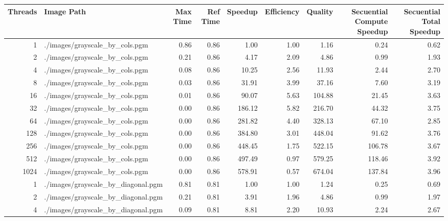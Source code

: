         \begin{table}[H]
            \centering
            \begin{adjustbox}{width=\textwidth, keepaspectratio}
                \begin{tabular}{rlrrrrrrr}
                    \toprule
                    Threads & Image Path & Max Time & Ref Time & Speedup & Efficiency & Quality & Secuential Compute Speedup & Secuential Total Speedup \\
                    \midrule
                    1 & ./images/grayscale\_by\_cols.pgm & 0.86 & 0.86 & 1.00 & 1.00 & 1.16 & 0.24 & 0.62 \\
                    2 & ./images/grayscale\_by\_cols.pgm & 0.21 & 0.86 & 4.17 & 2.09 & 4.86 & 0.99 & 1.93 \\
                    4 & ./images/grayscale\_by\_cols.pgm & 0.08 & 0.86 & 10.25 & 2.56 & 11.93 & 2.44 & 2.70 \\
                    8 & ./images/grayscale\_by\_cols.pgm & 0.03 & 0.86 & 31.91 & 3.99 & 37.16 & 7.60 & 3.19 \\
                    16 & ./images/grayscale\_by\_cols.pgm & 0.01 & 0.86 & 90.07 & 5.63 & 104.88 & 21.45 & 3.63 \\
                    32 & ./images/grayscale\_by\_cols.pgm & 0.00 & 0.86 & 186.12 & 5.82 & 216.70 & 44.32 & 3.75 \\
                    64 & ./images/grayscale\_by\_cols.pgm & 0.00 & 0.86 & 281.82 & 4.40 & 328.13 & 67.10 & 2.85 \\
                    128 & ./images/grayscale\_by\_cols.pgm & 0.00 & 0.86 & 384.80 & 3.01 & 448.04 & 91.62 & 3.76 \\
                    256 & ./images/grayscale\_by\_cols.pgm & 0.00 & 0.86 & 448.45 & 1.75 & 522.15 & 106.78 & 3.67 \\
                    512 & ./images/grayscale\_by\_cols.pgm & 0.00 & 0.86 & 497.49 & 0.97 & 579.25 & 118.46 & 3.92 \\
                    1024 & ./images/grayscale\_by\_cols.pgm & 0.00 & 0.86 & 578.91 & 0.57 & 674.04 & 137.84 & 3.96 \\
                    1 & ./images/grayscale\_by\_diagonal.pgm & 0.81 & 0.81 & 1.00 & 1.00 & 1.24 & 0.25 & 0.69 \\
                    2 & ./images/grayscale\_by\_diagonal.pgm & 0.21 & 0.81 & 3.91 & 1.96 & 4.86 & 0.99 & 1.97 \\
                    4 & ./images/grayscale\_by\_diagonal.pgm & 0.09 & 0.81 & 8.81 & 2.20 & 10.93 & 2.24 & 2.67 \\

\end{tabular}
\end{adjustbox}
\end{table}
